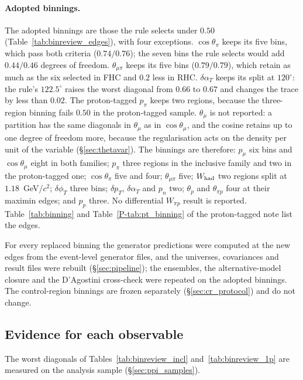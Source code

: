 \documentclass[11pt,a4paper]{article}
\newcommand{\ptref}[2]{#1~\ref{P-#2} of the proton-tagged note}
\begin{document}
\paragraph{Adopted binnings.}
The adopted binnings are those the rule selects under $0.50$ (Table~\ref{tab:binreview_edges}), with
four exceptions. $\cos\theta_\pi$ keeps its five bins, which pass both criteria ($0.74/0.76$); the
seven bins the rule selects would add $0.44/0.46$ degrees of freedom. $\theta_{\mu\pi}$ keeps its
five bins ($0.79/0.79$), which retain as much as the six selected in FHC and $0.2$ less in RHC.
$\delta\alpha_T$ keeps its split at $120^\circ$: the rule's $122.5^\circ$ raises the worst diagonal
from $0.66$ to $0.67$ and changes the trace by less than $0.02$. The proton-tagged $p_\pi$ keeps two
regions, because the three-region binning fails $0.50$ in the proton-tagged sample. $\theta_\mu$ is
not reported: a partition has the same diagonals in $\theta_\mu$ as in $\cos\theta_\mu$, and the
cosine retains up to one degree of freedom more, because the regularisation acts on the density per
unit of the variable (\S\ref{sec:thetavar}). The binnings are therefore: $p_\mu$ six bins and
$\cos\theta_\mu$ eight in both families; $p_\pi$ three regions in the inclusive family and two in the
proton-tagged one; $\cos\theta_\pi$ five and four; $\theta_{\mu\pi}$ five; $W_{\rm had}$ two regions
split at $1.18$~GeV/$c^2$; $\delta\phi_T$ three bins; $\delta p_T$, $\delta\alpha_T$ and $p_n$ two;
$\theta_p$ and $\theta_{\pi p}$ four at their maximin edges; and $p_p$ three. No differential
$W_{\pi p}$ result is reported. Table~\ref{tab:binning} and \ptref{Table}{tab:pt_binning} list the
edges.

For every replaced binning the generator predictions were computed at the new edges from the
event-level generator files, and the universes, covariances and result files were rebuilt
(\S\ref{sec:pipeline}); the ensembles, the alternative-model closure and the D'Agostini cross-check
were repeated on the adopted binnings. The control-region binnings are frozen separately
(\S\ref{sec:cr_protocol}) and do not change.

\subsection{Evidence for each observable}

The worst diagonals of Tables~\ref{tab:binreview_incl} and~\ref{tab:binreview_1p} are measured on the
analysis sample (\S\ref{sec:ppi_samples}).
\end{document}
